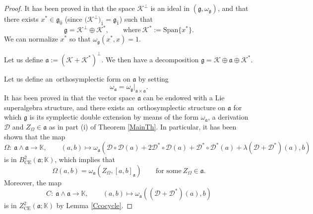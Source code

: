 \documentclass[10pt,a4paper]{amsart}
\numberwithin{equation}{section}
\begin{document}
\begin{proof}

It has been proved in \cite{BM} that the space $\mathscr{K}^\perp$ is an ideal in $(\mathfrak{g},\omega_\mathfrak{g})$, and that there exists $x^* \in \mathfrak{g}_{\bar 0}$ \big(since $\bigl(\mathscr{K}^\perp\bigr)_{\bar 1}=\mathfrak{g}_{\bar 1}$\big) such that
\[
\mathfrak{g}=\mathscr{K}^\perp\oplus \mathscr{K}^*, \qquad \text{where} \ \mathscr{K}^*:=\mathrm{Span}\{x^*\}.
\]
We can normalize $x^*$ so that $\omega_\mathfrak{g}(x^*,x)=1$.

Let us define $\mathfrak{a}:=(\mathscr{K} +\mathscr{K}^*)^\perp$. We then have a decomposition $\mathfrak{g}=\mathscr{K} \oplus \mathfrak{a} \oplus \mathscr{K}^*$.

Let us define an~orthosymplectic form on $\mathfrak{a}$ by setting
\[
\omega_\mathfrak{a}={\omega_\mathfrak{g}}\vert_{\mathfrak{a}\times \mathfrak{a}}.
\]
It has been proved in \cite{BM} that the vector space $\mathfrak{a}$ can be endowed with a Lie superalgebra structure, and there exists an~orthosymplectic structure on $\mathfrak{a}$ for which $\mathfrak{g}$ is its symplectic double extension by means of the form $\omega_\mathfrak{a}$, a derivation $\mathscr D$ and $Z_\Omega\in \mathfrak{a}$ as in part (i) of Theorem \ref{MainTh}. In particular, it has been shown that the map
\[
\Omega\colon\ \mathfrak{a}\wedge \mathfrak{a} \rightarrow \mathbb K, \qquad (a,b) \mapsto \omega_\mathfrak{a}( {\mathscr D} \circ {\mathscr D}(a) + 2 {\mathscr D}^* \circ {\mathscr D}(a)+ {\mathscr D}^* \circ {\mathscr D}^*(a) +\lambda ( {\mathscr D} + {\mathscr D} ^* )(a) , b)
\]
is in $B^2_{\text{CE}}(\mathfrak{a}; \mathbb K)$, which implies that
\begin{equation}\label{Omegatr}
\Omega(a,b)=\omega_\mathfrak{a}(Z_\Omega, [a,b]_\mathfrak{a}) \qquad \text{for some} \ Z_\Omega\in \mathfrak{a}.
\end{equation}
Moreover, the map
\[
C\colon\ \mathfrak{a}\wedge \mathfrak{a} \rightarrow \mathbb K, \qquad (a,b) \mapsto \omega_\mathfrak{a}(( {\mathscr D} + {\mathscr D}^*)(a) , b)
\]
is in $Z_{\mathrm{CE}}^2(\mathfrak{a}; \mathbb K)$ by Lemma \ref{Ccocycle}.


\end{proof}
\end{document}

